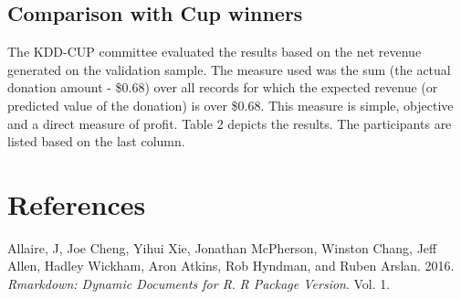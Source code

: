 \documentclass[
  11pt,
  a4paper,
  DIV=12,captions=tableheading,oneside]{scrbook}
\begin{document}
\hypertarget{comparison-with-cup-winners}{%
\section{Comparison with Cup winners}\label{comparison-with-cup-winners}}

The KDD-CUP committee evaluated the results based on the net revenue generated on the validation sample.
The measure used was the sum (the actual donation amount - \$0.68) over all records for which the expected revenue (or predicted value of the donation) is over \$0.68.
This measure is simple, objective and a direct measure of profit. Table 2 depicts the results. The participants are listed based on the last column.

\begin{table}[!h]

\caption{\label{tab:benchmark-cup-winners}Top five of the KDD-CUP participants. N* denotes the number for which the predicted donation amount is > $0.68. Sum is the total profit, meaning the donation minus $0.68 for each example.}
\centering
{}
\end{table}

\hypertarget{references}{%
\chapter*{References}\label{references}}

\hypertarget{refs}{}
\leavevmode\hypertarget{ref-allaire2016rmarkdown}{}%
Allaire, J, Joe Cheng, Yihui Xie, Jonathan McPherson, Winston Chang, Jeff Allen, Hadley Wickham, Aron Atkins, Rob Hyndman, and Ruben Arslan. 2016. \emph{Rmarkdown: Dynamic Documents for R}. \emph{R Package Version}. Vol. 1.
\end{document}
